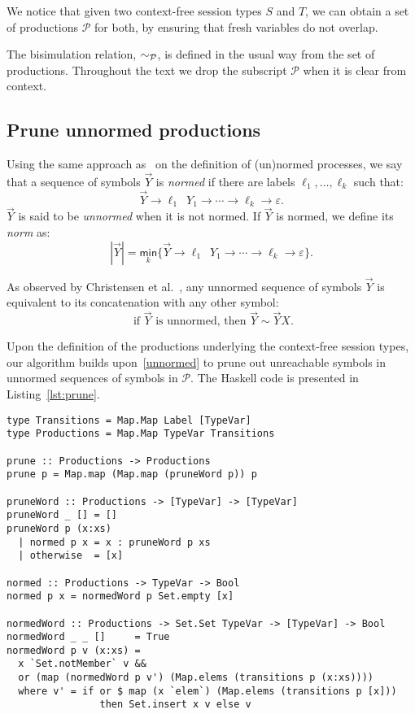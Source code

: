 We notice that given two context-free session types $S$ and $T$, we can obtain 
a set of productions $\mathcal{P}$ for both, by ensuring that fresh variables
do not overlap.

The bisimulation relation, $\sim_{\mathcal{P}}$, is defined in the usual way from the 
set of productions. Throughout the text we drop the subscript $\mathcal{P}$ when 
it is clear from context.

\subsection{Prune unnormed productions}
\label{subsec:prune}

Using the same approach as~\cite{DBLP:journals/iandc/ChristensenHS95} on 
the definition of (un)normed processes, we say that a sequence of symbols 
$\vec Y$ is \emph{normed} if there are labels $\ell_1,\ldots, \ell_k$ 
such that:
\[\vec Y \rightarrow \ell_1\enspace Y_1 \rightarrow \cdots \rightarrow \ell_k 
\rightarrow \varepsilon.\]
$\vec Y$ is said to be \emph{unnormed} when it is not normed. If $\vec Y$ 
is normed, we define its \emph{norm} as: 
\[ | \vec Y | = \underset{k}{\mathsf{min}} \{\vec Y \rightarrow \ell_1\enspace Y_1 
\rightarrow \cdots \rightarrow \ell_k \rightarrow \varepsilon \}.\]

As observed by Christensen et al.~\cite{DBLP:journals/iandc/ChristensenHS95}, 
any unnormed sequence of symbols $\vec Y$ is equivalent to its concatenation 
with any other symbol:
\begin{equation}
\label{unnormed}
\text{ if } \vec Y \text{ is unnormed, then } \vec Y \sim \vec Y X.
\end{equation}

Upon the definition of the productions underlying the context-free session types,
our algorithm builds upon~\eqref{unnormed} to prune out unreachable symbols in
unnormed sequences of symbols in $\mathcal{P}$. The Haskell code 
is presented in Listing~\ref{lst:prune}.

\begin{lstlisting}[caption={Haskell code for the stage of pruning unnormed productions},label={lst:prune},captionpos=b]
type Transitions = Map.Map Label [TypeVar]
type Productions = Map.Map TypeVar Transitions

prune :: Productions -> Productions
prune p = Map.map (Map.map (pruneWord p)) p

pruneWord :: Productions -> [TypeVar] -> [TypeVar]
pruneWord _ [] = []
pruneWord p (x:xs)
  | normed p x = x : pruneWord p xs
  | otherwise  = [x]

normed :: Productions -> TypeVar -> Bool
normed p x = normedWord p Set.empty [x]

normedWord :: Productions -> Set.Set TypeVar -> [TypeVar] -> Bool
normedWord _ _ []     = True
normedWord p v (x:xs) =
  x `Set.notMember` v &&
  or (map (normedWord p v') (Map.elems (transitions p (x:xs))))
  where v' = if or $ map (x `elem`) (Map.elems (transitions p [x])) 
                then Set.insert x v else v
\end{lstlisting}

